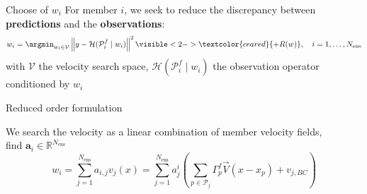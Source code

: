 \documentclass[aspectratio=169]{beamer} %
\begin{document}
\begin{frame}{Choose of $w_i$}
    For member $i$, we seek to reduce the discrepancy between \textbf{predictions} and the \textbf{observations}:
    \begin{equation*}
        w_i = \argmin_{w_i \in \mathcal V} \left\|y - \mathcal H(\mathcal{P}_i^f \mid w_i) \right\|^2 \visible<2->{\textcolor{ceared}{+ R(w)}}, \quad i = 1, \dots, N_{\text{ens}}
    \end{equation*}with $\mathcal V$ the velocity search space, $\mathcal H(\mathcal{P}_i^f \mid w_i)$ the observation operator conditioned by $w_i$\\
    \vfill
    \vfill
    \vfill
\end{frame}

\begin{frame}{Reduced order formulation}

    We search the velocity as a linear combination of member velocity fields,\\
    find $\bm a_i \in \mathbb{R}^{N_{\text{ens}}}$ \\
    \begin{equation*}
        w_i = \sum_{j=1}^{N_{\text{ens}}} a_{i,j} v_j (x) = \sum_{j=1}^{N_{\text{ens}}} a^i_j \left(\sum_{p \in \mathcal P_j} \Gamma_p^f \vec{V}(x - x_p) + v_{j,BC} \right)
    \end{equation*}
    \vfill
    \vfill

\end{frame}
\end{document}

